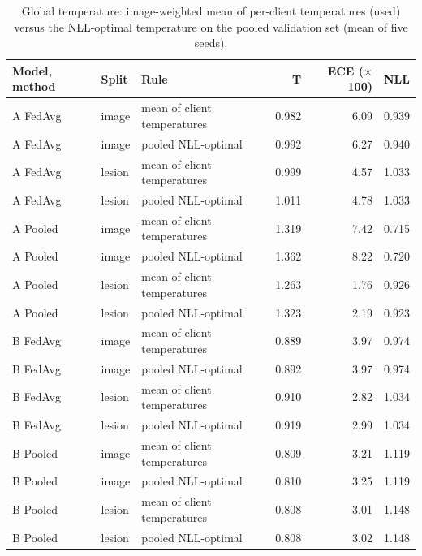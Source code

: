 \documentclass[10pt]{article}
\begin{document}
\begin{table}[!htbp]
\centering
\scriptsize
\caption{Global temperature: image-weighted mean of per-client temperatures (used) versus the NLL-optimal temperature on the pooled validation set (mean of five seeds).}
\label{tab:s8t}
\begin{tabular}{@{}lllrrr@{}}
\toprule
Model, method & Split & Rule & T & ECE ($\times$100) & NLL \\
\midrule
A FedAvg & image & mean of client temperatures & 0.982 & 6.09 & 0.939 \\
A FedAvg & image & pooled NLL-optimal & 0.992 & 6.27 & 0.940 \\
A FedAvg & lesion & mean of client temperatures & 0.999 & 4.57 & 1.033 \\
A FedAvg & lesion & pooled NLL-optimal & 1.011 & 4.78 & 1.033 \\
A Pooled & image & mean of client temperatures & 1.319 & 7.42 & 0.715 \\
A Pooled & image & pooled NLL-optimal & 1.362 & 8.22 & 0.720 \\
A Pooled & lesion & mean of client temperatures & 1.263 & 1.76 & 0.926 \\
A Pooled & lesion & pooled NLL-optimal & 1.323 & 2.19 & 0.923 \\
B FedAvg & image & mean of client temperatures & 0.889 & 3.97 & 0.974 \\
B FedAvg & image & pooled NLL-optimal & 0.892 & 3.97 & 0.974 \\
B FedAvg & lesion & mean of client temperatures & 0.910 & 2.82 & 1.034 \\
B FedAvg & lesion & pooled NLL-optimal & 0.919 & 2.99 & 1.034 \\
B Pooled & image & mean of client temperatures & 0.809 & 3.21 & 1.119 \\
B Pooled & image & pooled NLL-optimal & 0.810 & 3.25 & 1.119 \\
B Pooled & lesion & mean of client temperatures & 0.808 & 3.01 & 1.148 \\
B Pooled & lesion & pooled NLL-optimal & 0.808 & 3.02 & 1.148 \\
\bottomrule
\end{tabular}
\end{table}
\end{document}
